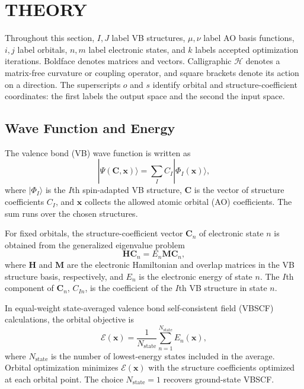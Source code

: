 \documentclass[12pt]{article}
\begin{document}
\section{THEORY}

Throughout this section, \(I,J\) label VB structures, \(\mu,\nu\) label AO basis functions, \(i,j\) label orbitals, \(n,m\) label electronic states, and \(k\) labels accepted optimization iterations. Boldface denotes matrices and vectors. Calligraphic \(\mathcal H\) denotes a matrix-free curvature or coupling operator, and square brackets denote its action on a direction. The superscripts \(o\) and \(s\) identify orbital and structure-coefficient coordinates: the first labels the output space and the second the input space.

\subsection{Wave Function and Energy}

The valence bond (VB) wave function is written as
\begin{equation}
 |\Psi(\mathbf C,\mathbf x)\rangle=\sum_I C_I|\Phi_I(\mathbf x)\rangle ,
 \label{eq:ansatz}
\end{equation}
where \(|\Phi_I\rangle\) is the \(I\)th spin-adapted VB structure, \(\mathbf C\) is the vector of structure coefficients \(C_I\), and \(\mathbf x\) collects the allowed atomic orbital (AO) coefficients. The sum runs over the chosen structures.

For fixed orbitals, the structure-coefficient vector \(\mathbf C_n\) of electronic state \(n\) is obtained from the generalized eigenvalue problem
\begin{equation}
 \mathbf H\mathbf C_n=E_n\mathbf M\mathbf C_n,
 \label{eq:eigenproblem}
\end{equation}
where \(\mathbf H\) and \(\mathbf M\) are the electronic Hamiltonian and overlap matrices in the VB structure basis, respectively, and \(E_n\) is the electronic energy of state \(n\). The \(I\)th component of \(\mathbf C_n\), \(C_{In}\), is the coefficient of the \(I\)th VB structure in state \(n\).

In equal-weight state-averaged valence bond self-consistent field (VBSCF) calculations, the orbital objective is
\begin{equation}
 \mathcal E(\mathbf x)=\frac{1}{N_{\mathrm{state}}}
 \sum_{n=1}^{N_{\mathrm{state}}}E_n(\mathbf x),
 \label{eq:stateaverage}
\end{equation}
where \(N_{\mathrm{state}}\) is the number of lowest-energy states included in the average. Orbital optimization minimizes \(\mathcal E(\mathbf x)\) with the structure coefficients optimized at each orbital point. The choice \(N_{\mathrm{state}}=1\) recovers ground-state VBSCF.
\end{document}
